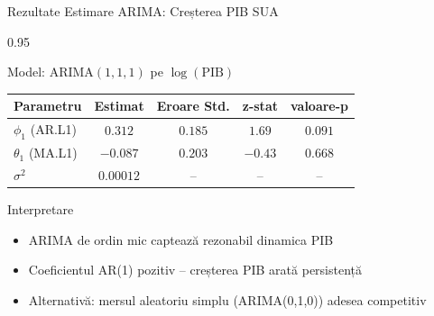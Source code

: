 \documentclass[9pt, aspectratio=169, t]{beamer}
\begin{document}
\begin{frame}{Rezultate Estimare ARIMA: Creșterea PIB SUA}
    \begin{cminipage}{0.95\textwidth}
    {\small
    \begin{block}{Model: ARIMA$(1,1,1)$ pe $\log(\text{PIB})$}
        \begin{center}
        \begin{tabular}{lcccc}
            \toprule
            \textbf{Parametru} & \textbf{Estimat} & \textbf{Eroare Std.} & \textbf{z-stat} & \textbf{valoare-p} \\
            \midrule
            $\phi_1$ (AR.L1) & $0.312$ & $0.185$ & $1.69$ & $0.091$ \\
            $\theta_1$ (MA.L1) & $-0.087$ & $0.203$ & $-0.43$ & $0.668$ \\
            $\sigma^2$ & $0.00012$ & -- & -- & -- \\
            \bottomrule
        \end{tabular}
        \end{center}
    \end{block}

    \vspace{0.2cm}

    \begin{exampleblock}{Interpretare}
        \begin{itemize}\setlength{\itemsep}{0pt}
            \item ARIMA de ordin mic captează rezonabil dinamica PIB
            \item Coeficientul AR(1) pozitiv -- creșterea PIB arată persistență
            \item Alternativă: mersul aleatoriu simplu (ARIMA(0,1,0)) adesea competitiv
        \end{itemize}
    \end{exampleblock}
    }
    \end{cminipage}
\end{frame}
\end{document}
